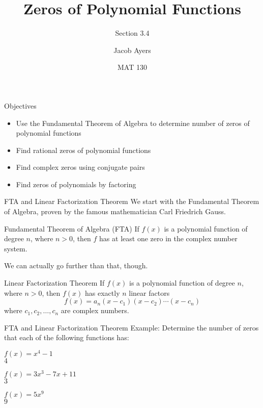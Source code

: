 \documentclass[t]{beamer}
\title[3.4]{Zeros of Polynomial Functions}
\subtitle{Section 3.4}
\author{Jacob Ayers}
\institute{Lesson \#13}
\date{MAT 130}
\newcommand{\fp}[1]{\left({#1}\right)} %
\begin{document}
	
	\begin{frame}
		\titlepage
	\end{frame}
	
	\begin{frame}{Objectives}
		\begin{itemize}
			\item Use the Fundamental Theorem of Algebra to determine number of zeros of polynomial functions
			\item Find rational zeros of polynomial functions
			\item Find complex zeros using conjugate pairs
			\item Find zeros of polynomials by factoring
		\end{itemize}
	\end{frame}

	\begin{frame}{FTA and Linear Factorization Theorem}
		We start with the Fundamental Theorem of Algebra, proven by the famous mathematician Carl Friedrich Gauss.
		
		\begin{block}{Fundamental Theorem of Algebra (FTA)}
			If $f(x)$ is a polynomial function of degree $n$, where $n > 0$, then $f$ has at least one zero in the complex number system.
		\end{block}
	
		\pause
	
		We can actually go further than that, though.
		
		\pause
		
		\begin{block}{Linear Factorization Theorem}
			If $f(x)$ is a polynomial function of degree $n$, where $n > 0$, then $f(x)$ has exactly $n$ linear factors $$f(x) = a_n\fp{x-c_1}\fp{x-c_2}\cdots\fp{x-c_n}$$ where $c_1,c_2,\dots,c_n$ are complex numbers.
		\end{block}
	\end{frame}

	\begin{frame}{FTA and Linear Factorization Theorem}
		Example: Determine the number of zeros that each of the following functions has:
		
		$f(x) = x^4 - 1$ \\ \pause $4$ \pause
		
		$f(x) = 3x^3 - 7x + 11$ \\ \pause $3$
		
		\pause $f(x) = 5x^9$ \\ \pause $9$
	\end{frame}
\end{document}
